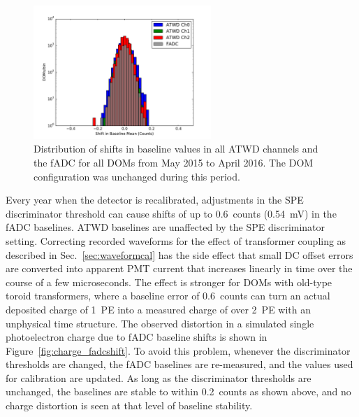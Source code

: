 \begin{figure}[!h]
 \centering
 \includegraphics[width=0.6\textwidth]{graphics/dom/reliability/baseline_stability_2015.pdf}
 \caption{Distribution of shifts in baseline values in all ATWD
   channels and the fADC for all DOMs from May 2015 to April
   2016. The DOM configuration was unchanged during this period.}
 \label{fig:baseline_stability_2015}
\end{figure}

Every year when the detector
is recalibrated, adjustments in the SPE discriminator threshold can
cause shifts of up to 0.6~counts (0.54~mV) in the fADC
baselines. ATWD baselines are unaffected by the SPE discriminator
setting. Correcting recorded waveforms for the effect of transformer
coupling as described in Sec.~\ref{sec:waveformcal} has
the side effect that small DC offset errors are converted into
apparent PMT current that increases linearly in time over the course
of a few microseconds. The effect is stronger for DOMs with old-type toroid
transformers, where a baseline error of 0.6~counts can 
turn an actual deposited charge of 1~PE into a measured charge of over
2~PE with an unphysical time structure. The observed distortion in a
simulated single photoelectron charge due to fADC baseline shifts is
shown in Figure~\ref{fig:charge_fadcshift}.  To avoid this problem, whenever the
discriminator thresholds are changed, the fADC baselines are re-measured,
and the values used for calibration are updated. As long as 
the discriminator thresholds are unchanged, the baselines are stable
to within 0.2~counts
as shown above, and no charge distortion is seen at that level of
baseline stability.

